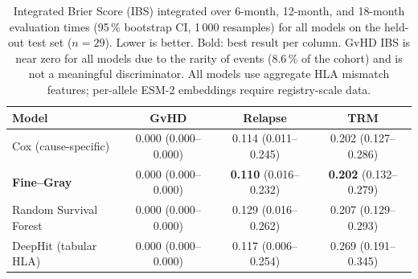 \documentclass[12pt]{article}
\begin{document}
\begin{table}[htbp]
  \caption{Integrated Brier Score (IBS) integrated over 6-month, 12-month, and
    18-month evaluation times (95\,\% bootstrap CI, 1\,000 resamples) for all
    models on the held-out test set ($n=29$).  Lower is better.
    Bold: best result per column.
    GvHD IBS is near zero for all models due to the rarity of events (8.6\,\%
    of the cohort) and is not a meaningful discriminator.
    All models use aggregate HLA mismatch features; per-allele ESM-2 embeddings
    require registry-scale data.}
  \label{tab:ibs}
  \centering
  \begin{tabular}{lccc}
    \toprule
    \textbf{Model} & \textbf{GvHD} & \textbf{Relapse} & \textbf{TRM} \\
    \midrule
    Cox (cause-specific)        & 0.000 (0.000--0.000) & 0.114 (0.011--0.245) & 0.202 (0.127--0.286) \\
    \textbf{Fine--Gray}         & 0.000 (0.000--0.000) & \textbf{0.110} (0.016--0.232) & \textbf{0.202} (0.132--0.279) \\
    Random Survival Forest      & 0.000 (0.000--0.000) & 0.129 (0.016--0.262) & 0.207 (0.129--0.293) \\
    DeepHit (tabular HLA)       & 0.000 (0.000--0.000) & 0.117 (0.006--0.254) & 0.269 (0.191--0.345) \\
    \bottomrule
  \end{tabular}
\end{table}
\end{document}
